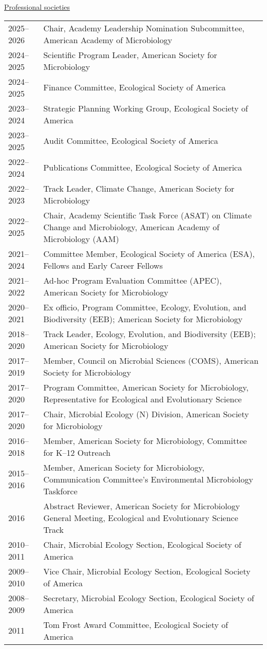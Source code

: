 \documentclass[11pt]{article}  %
\begin{document}
\vspace{-0.5em}
\textnormal{\underline{Professional societies}} \\[-2.5em]
\begin{longtable}{@{}p{4em}@{\hspace{2em}}p{}@{}}
2025--2026 & Chair, Academy Leadership Nomination Subcommittee, American Academy of Microbiology \\
2024--2025 & Scientific Program Leader, American Society for Microbiology \\
2024--2025 & Finance Committee, Ecological Society of America \\
2023--2024 & Strategic Planning Working Group, Ecological Society of America \\
2023--2025 & Audit Committee, Ecological Society of America \\
2022--2024 & Publications Committee, Ecological Society of America \\
2022--2023 & Track Leader, Climate Change, American Society for Microbiology \\
2022--2025 & Chair, Academy Scientific Task Force (ASAT) on Climate Change and Microbiology, American Academy of Microbiology (AAM) \\
2021--2024 & Committee Member, Ecological Society of America (ESA), Fellows and Early Career Fellows \\
2021--2022 & Ad-hoc Program Evaluation Committee (APEC), American Society for Microbiology \\
2020--2021 & Ex officio, Program Committee, Ecology, Evolution, and Biodiversity (EEB); American Society for Microbiology \\
2018--2020 & Track Leader, Ecology, Evolution, and Biodiversity (EEB); American Society for Microbiology \\
2017--2019 & Member, Council on Microbial Sciences (COMS), American Society for Microbiology \\
2017--2020 & Program Committee, American Society for Microbiology, Representative for Ecological and Evolutionary Science \\
2017--2020 & Chair, Microbial Ecology (N) Division, American Society for Microbiology \\
2016--2018 & Member, American Society for Microbiology, Committee for K--12 Outreach \\
2015--2016 & Member, American Society for Microbiology, Communication Committee’s Environmental Microbiology Taskforce \\
2016 & Abstract Reviewer, American Society for Microbiology General Meeting, Ecological and Evolutionary Science Track \\
2010--2011 & Chair, Microbial Ecology Section, Ecological Society of America \\
2009--2010 & Vice Chair, Microbial Ecology Section, Ecological Society of America \\
2008--2009 & Secretary, Microbial Ecology Section, Ecological Society of America \\
2011 & Tom Frost Award Committee, Ecological Society of America \\
\end{longtable}
\end{document}
